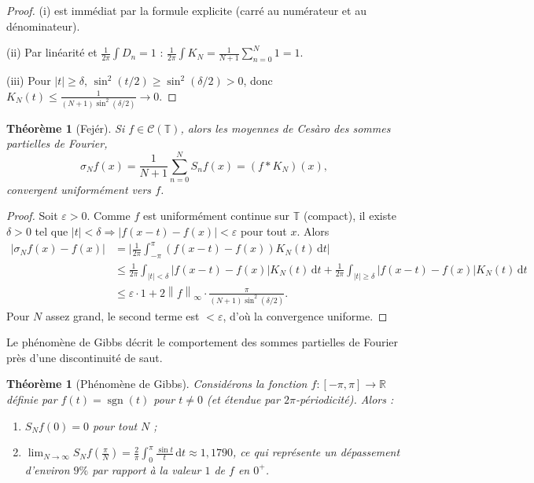 \documentclass[a4paper,12pt]{book}
\DeclareMathOperator{\sgn}{sgn}
\newcommand{\R}{\mathbb{R}}
\newcommand{\dd}{\mathrm{d}}
\newcommand{\norm}[1]{\left\| #1 \right\|}
\newcommand{\abs}[1]{\left| #1 \right|}
\theoremstyle{definition}
\theoremstyle{plain}
\newtheorem{theoreme}[definition]{Théorème}
\theoremstyle{remark}
\begin{document}
\begin{proof}
(i) est immédiat par la formule explicite (carré au numérateur et au dénominateur).

(ii) Par linéarité et $\frac{1}{2\pi}\int D_n = 1$ :
$\frac{1}{2\pi}\int K_N = \frac{1}{N+1}\sum_{n=0}^{N} 1 = 1$.

(iii) Pour $\abs{t} \geq \delta$, $\sin^2(t/2) \geq \sin^2(\delta/2) > 0$, donc
$K_N(t) \leq \frac{1}{(N+1)\sin^2(\delta/2)} \to 0$.
\end{proof}

\begin{theoreme}[Fejér]
\label{thm:fejer}
Si $f \in \mathcal{C}(\mathbb{T})$, alors les moyennes de Cesàro
des sommes partielles de Fourier,
\[
  \sigma_N f(x) = \frac{1}{N+1} \sum_{n=0}^{N} S_n f(x) = (f * K_N)(x),
\]
convergent uniformément vers $f$.
\end{theoreme}

\begin{proof}
Soit $\varepsilon > 0$. Comme $f$ est uniformément continue sur $\mathbb{T}$ (compact),
il existe $\delta > 0$ tel que $\abs{t} < \delta \Rightarrow \abs{f(x-t) - f(x)} < \varepsilon$
pour tout $x$. Alors
\begin{align*}
  \abs{\sigma_N f(x) - f(x)}
  &= \biggl\lvert \frac{1}{2\pi}\int_{-\pi}^{\pi} (f(x-t) - f(x)) K_N(t)\, \dd t \biggr\rvert \\
  &\leq \frac{1}{2\pi}\int_{\abs{t} < \delta} \abs{f(x-t)-f(x)} K_N(t)\, \dd t
    + \frac{1}{2\pi}\int_{\abs{t} \geq \delta} \abs{f(x-t)-f(x)} K_N(t)\, \dd t \\
  &\leq \varepsilon \cdot 1 + 2\norm{f}_\infty \cdot \frac{\pi}{(N+1)\sin^2(\delta/2)}.
\end{align*}
Pour $N$ assez grand, le second terme est $< \varepsilon$, d'où la convergence uniforme.
\end{proof}

Le phénomène de Gibbs décrit le comportement des sommes partielles de Fourier
près d'une discontinuité de saut.

\begin{theoreme}[Phénomène de Gibbs]
\label{thm:gibbs}
Considérons la fonction $f : [-\pi, \pi] \to \R$ définie par $f(t) = \sgn(t)$
pour $t \neq 0$ (et étendue par $2\pi$-périodicité). Alors :
\begin{enumerate}[label=(\roman*)]
  \item $S_N f(0) = 0$ pour tout $N$ ;
  \item $\displaystyle\lim_{N \to \infty} S_N f\!\left(\frac{\pi}{N}\right)
    = \frac{2}{\pi}\int_0^{\pi} \frac{\sin t}{t}\, \dd t \approx 1{,}1790$,
    ce qui représente un dépassement d'environ $9\%$
    par rapport à la valeur $1$ de $f$ en $0^+$.
\end{enumerate}
\end{theoreme}
\end{document}
